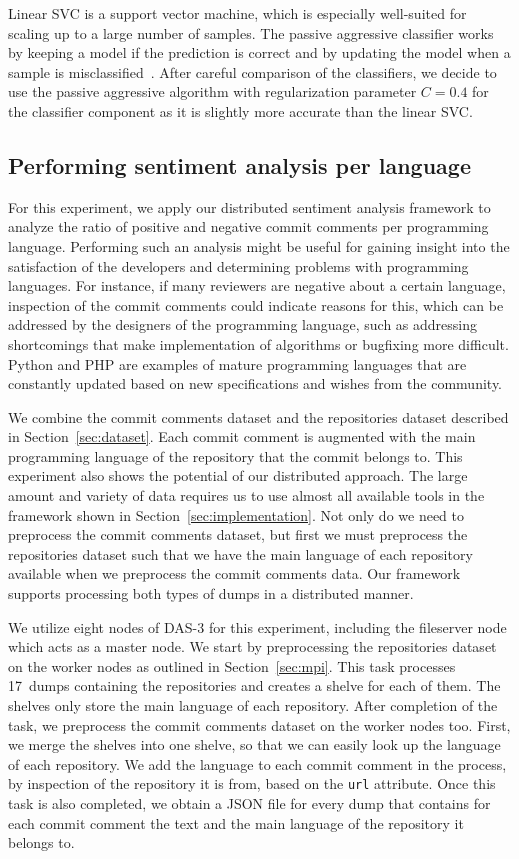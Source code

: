 \documentclass{article}
\begin{document}
Linear SVC is a support vector machine, which is especially well-suited for 
scaling up to a large number of samples. The passive aggressive classifier 
works by keeping a model if the prediction is correct and by updating the model 
when a sample is misclassified~\cite{crammer2006passive}. After careful 
comparison of the classifiers, we decide to use the passive aggressive 
algorithm with regularization parameter $C = 0.4$ for the classifier component 
as it is slightly more accurate than the linear SVC.

\subsection{Performing sentiment analysis per language}\label{sec:sentiment-analysis-per-language}
For this experiment, we apply our distributed sentiment analysis framework to
analyze the ratio of positive and negative commit comments per programming
language. Performing such an analysis might be useful for gaining insight into 
the satisfaction of the developers and determining problems with programming 
languages. For instance, if many reviewers are negative about a certain 
language, inspection of the commit comments could indicate reasons for this, 
which can be addressed by the designers of the programming language, such as 
addressing shortcomings that make implementation of algorithms or bugfixing
more difficult. Python and PHP are examples of mature programming languages
that are constantly updated based on new specifications and wishes from the
community.

We combine the commit comments dataset and the repositories dataset described 
in Section~\ref{sec:dataset}. Each commit comment is augmented with the main 
programming language of the repository that the commit belongs to. This 
experiment also shows the potential of our distributed approach. The large
amount and variety of data requires us to use almost all available tools in the
framework shown in Section~\ref{sec:implementation}. Not only do we need to
preprocess the commit comments dataset, but first we must preprocess the
repositories dataset such that we have the main language of each repository
available when we preprocess the commit comments data. Our framework supports
processing both types of dumps in a distributed manner.

We utilize eight nodes of DAS-3 for this experiment, including the fileserver 
node which acts as a master node. We start by preprocessing the repositories 
dataset on the worker nodes as outlined in Section~\ref{sec:mpi}. This task 
processes 17~dumps containing the repositories and creates a shelve for each of 
them. The shelves only store the main language of each repository. After 
completion of the task, we preprocess the commit comments dataset on the worker 
nodes too. First, we merge the shelves into one shelve, so that we can easily 
look up the language of each repository. We add the language to each commit 
comment in the process, by inspection of the repository it is from, based on 
the {\tt url} attribute. Once this task is also completed, we obtain a JSON 
file for every dump that contains for each commit comment the text and the main 
language of the repository it belongs to.
\end{document}
